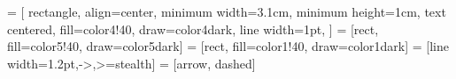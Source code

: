 \usetikzlibrary{calc}
\usetikzlibrary{shapes.geometric, arrows}

 = [
    rectangle,
    align=center,
    minimum width=3.1cm,
    minimum height=1cm,
    text centered,
    fill=color4!40,
    draw=color4dark,
    line width=1pt,
]
 = [rect, fill=color5!40, draw=color5dark]
 = [rect, fill=color1!40, draw=color1dark]
 = [line width=1.2pt,->,>=stealth]
 = [arrow, dashed]

